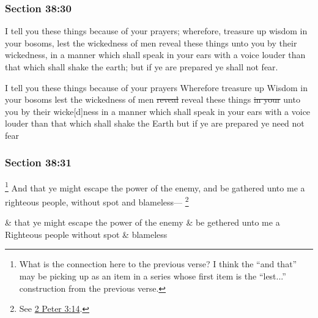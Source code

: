 	\subsubsection{Section 38:30} %
		\label{DC38-30}

		I tell you these things because of your prayers; wherefore, treasure up wisdom in your bosoms, lest the wickedness of men reveal these things unto you by their wickedness, in a manner which shall speak in your ears with a voice louder than that which shall shake the earth; but if ye are prepared ye shall not fear.

		\begin{framed}
		\scriptsize
			\begin{compactdesc}
				\item[JSP] I tell you these things because of your prayers Wherefore treasure up Wisdom in your bosoms lest the wickedness of men \sout{reveal} reveal these things \sout{in your} unto you by their wicke[d]ness in a manner which shall speak in your ears with a voice louder than that which shall shake the Earth but if ye are prepared ye need not fear
			\end{compactdesc}
		\end{framed}

	\subsubsection{Section 38:31} %
		\label{DC38-31}

			\footnote{%
				What is the connection here to the previous verse? I think the ``and that'' may be picking up as an item in a series whose first item is the ``lest...'' construction from the previous verse.
				}%
		And that ye might escape the power of the enemy, and be gathered unto me a righteous people, without spot and blameless---%
			\footnote{%
				See \hyperref[2PETER-3-14]{2 Peter 3:14}.
				}

		\begin{framed}
		\scriptsize
			\begin{compactdesc}
				\item[JSP] \& that ye might escape the power of the enemy \& be gethered unto me a Righteous people without spot \& blameless
			\end{compactdesc}
		\end{framed}

